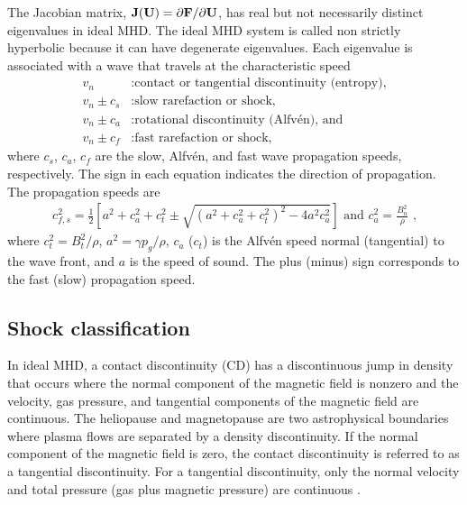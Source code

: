 The Jacobian matrix, $\mathbf{J}(\mathbf{U}) = \partial{\ensuremath{\mathbf{F}}}/\partial{\ensuremath{\mathbf{U}}}$, has real but not necessarily distinct eigenvalues in ideal MHD.  The ideal MHD system is called non strictly hyperbolic because it can have degenerate eigenvalues.  Each eigenvalue is associated with a wave that travels at the characteristic speed
\begin{align*}
v_n &: \text{contact or tangential discontinuity (entropy),} \\
v_n \pm c_s &: \text{slow rarefaction or shock,} \\
v_n \pm c_a &: \text{rotational discontinuity (Alfv{\'e}n), and} \\
v_n \pm c_f &: \text{fast rarefaction or shock,} 
\end{align*} 
where $c_s$, $c_a$, $c_f$ are the slow, Alfv{\'e}n, and fast wave propagation speeds, respectively.  The sign in each equation indicates the direction of propagation.  The propagation speeds are
\begin{gather*}
 c^2_{f,s} = \frac{1}{2}\left[ a^2 + c_a^2 + c_{t}^2 \pm \sqrt{\left(a^2 + c_a^2 + c_{t}^2 \right)^2 - 4a^2c_a^2}\right] \text{ and }
c^2_a = \frac{B_n^2}{\rho}\text{ ,}
\end{gather*} 
where $c^2_{t} = B_{t}^2/\rho$, $a^2 = \gamma p_g/\rho$, $c_{a}$ ($c_{t}$) is the Alfv{\'e}n speed normal (tangential) to the wave front, and $a$ is the speed of sound.  The plus (minus) sign corresponds to the fast (slow) propagation speed.  

\subsection[Shock classification]{Shock classification}
\label{sec:shock_class}

In ideal MHD, a contact discontinuity (CD) has a discontinuous jump in density that occurs where the normal component of the magnetic field is nonzero and the velocity, gas pressure, and tangential components of the magnetic field are continuous. The heliopause and magnetopause are two astrophysical boundaries where plasma flows are separated by a density discontinuity.  If the normal component of the magnetic field is zero, the contact discontinuity is referred to as a tangential discontinuity.  For a tangential discontinuity, only the normal velocity and total pressure (gas plus magnetic pressure) are continuous \citep{Jeffrey:1966}. 

